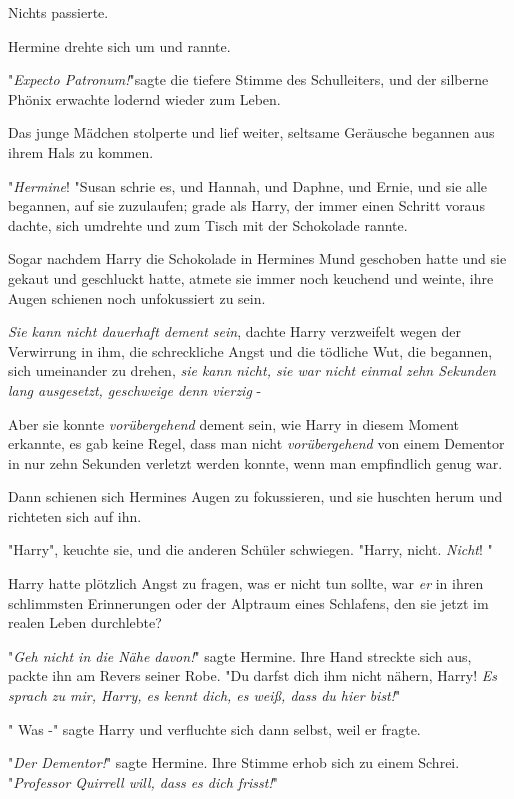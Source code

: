 {Nichts passierte.

Hermine drehte sich um und rannte.

"\emph{Expecto Patronum!}"sagte die tiefere Stimme des Schulleiters, und der silberne Phönix erwachte lodernd wieder zum Leben.

Das junge Mädchen stolperte und lief weiter, seltsame Geräusche begannen aus ihrem Hals zu kommen.

"\emph{Hermine}! "Susan schrie es, und Hannah, und Daphne, und Ernie, und sie alle begannen, auf sie zuzulaufen; grade als Harry, der immer einen Schritt voraus dachte, sich umdrehte und zum Tisch mit der Schokolade rannte.

Sogar nachdem Harry die Schokolade in Hermines Mund geschoben hatte und sie gekaut und geschluckt hatte, atmete sie immer noch keuchend und weinte, ihre Augen schienen noch unfokussiert zu sein.

\emph{Sie kann nicht dauerhaft dement sein}, dachte Harry verzweifelt wegen der Verwirrung in ihm, die schreckliche Angst und die tödliche Wut, die begannen, sich umeinander zu drehen, \emph{sie kann nicht, sie war nicht einmal zehn Sekunden lang ausgesetzt, geschweige denn vierzig} -

Aber sie konnte \emph{vorübergehend} dement sein, wie Harry in diesem Moment erkannte, es gab keine Regel, dass man nicht \emph{vorübergehend} von einem Dementor in nur zehn Sekunden verletzt werden konnte, wenn man empfindlich genug war.

Dann schienen sich Hermines Augen zu fokussieren, und sie huschten herum und richteten sich auf ihn.

"Harry", keuchte sie, und die anderen Schüler schwiegen. "Harry, nicht. \emph{Nicht}! "

Harry hatte plötzlich Angst zu fragen, was er nicht tun sollte, war \emph{er} in ihren schlimmsten Erinnerungen oder der Alptraum eines Schlafens, den sie jetzt im realen Leben durchlebte?

"\emph{Geh nicht in die Nähe davon!}" sagte Hermine. Ihre Hand streckte sich aus, packte ihn am Revers seiner Robe. "Du darfst dich ihm nicht nähern, Harry! \emph{Es sprach zu mir, Harry, es kennt dich, es weiß, dass du hier bist!}"

" Was -" sagte Harry und verfluchte sich dann selbst, weil er fragte.

"\emph{Der Dementor!}" sagte Hermine. Ihre Stimme erhob sich zu einem Schrei. "\emph{Professor Quirrell will, dass es dich frisst!}"

}
